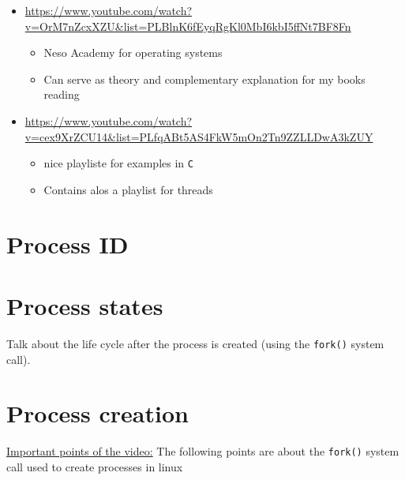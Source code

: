 \documentclass[12pt,a4paper]{book}
\begin{document}
\begin{itemize}

\item \url{https://www.youtube.com/watch?v=OrM7nZcxXZU&list=PLBlnK6fEyqRgKl0MbI6kbI5ffNt7BF8Fn}

    \begin{itemize}
        \item Neso Academy for operating systems

        \item Can serve as theory and complementary explanation for my books reading
    \end{itemize}

\item  \url{https://www.youtube.com/watch?v=cex9XrZCU14&list=PLfqABt5AS4FkW5mOn2Tn9ZZLLDwA3kZUY}

    \begin{itemize}
        \item nice playliste for examples in \verb|C|

        \item Contains alos a playlist for threads
    \end{itemize}

\end{itemize}

\section{Process ID}

\newpage
\section{Process states}

Talk about the life cycle after the process is created (using the \verb|fork()| system call).

\newpage
\section{Process creation}

\underline{Important points of the video:} The following points are about the \verb|fork()| system call used to create processes in linux
\end{document}
